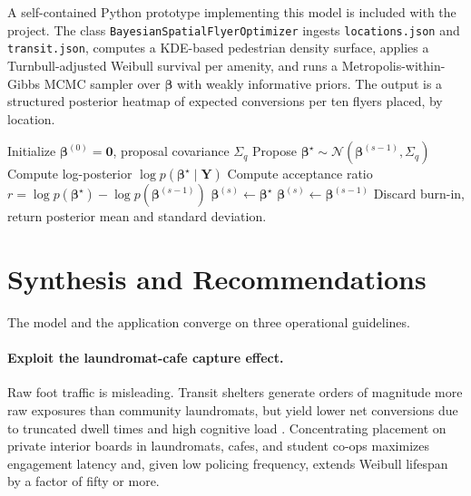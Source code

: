 \documentclass[sigconf,nonacm]{acmart}
\begin{document}
A self-contained Python prototype implementing this model is included with the project. The class \texttt{BayesianSpatialFlyerOptimizer} ingests \texttt{locations.json} and \texttt{transit.json}, computes a KDE-based pedestrian density surface, applies a Turnbull-adjusted Weibull survival per amenity, and runs a Metropolis-within-Gibbs MCMC sampler over $\boldsymbol{\beta}$ with weakly informative priors. The output is a structured posterior heatmap of expected conversions per ten flyers placed, by location.

\begin{algorithm}[t]
\caption{Metropolis-within-Gibbs for $\boldsymbol{\beta}$}
\label{alg:mh}
\begin{algorithmic}[1]
\State Initialize $\boldsymbol{\beta}^{(0)} = \mathbf{0}$, proposal covariance $\Sigma_q$
    \State Propose $\boldsymbol{\beta}^\star \sim \mathcal{N}(\boldsymbol{\beta}^{(s-1)}, \Sigma_q)$
    \State Compute log-posterior $\log p(\boldsymbol{\beta}^\star \mid \mathbf{Y})$
    \State Compute acceptance ratio $r = \log p(\boldsymbol{\beta}^\star) - \log p(\boldsymbol{\beta}^{(s-1)})$
        \State $\boldsymbol{\beta}^{(s)} \gets \boldsymbol{\beta}^\star$
    \Else
        \State $\boldsymbol{\beta}^{(s)} \gets \boldsymbol{\beta}^{(s-1)}$
    \EndIf
\EndFor
\State Discard burn-in, return posterior mean and standard deviation.
\end{algorithmic}
\end{algorithm}

\section{Synthesis and Recommendations}
\label{sec:synthesis}

The model and the application converge on three operational guidelines.

\paragraph{Exploit the laundromat-cafe capture effect.} Raw foot traffic is misleading. Transit shelters generate orders of magnitude more raw exposures than community laundromats, but yield lower net conversions due to truncated dwell times and high cognitive load \cite{transit-volumes}. Concentrating placement on private interior boards in laundromats, cafes, and student co-ops maximizes engagement latency and, given low policing frequency, extends Weibull lifespan by a factor of fifty or more.
\end{document}
